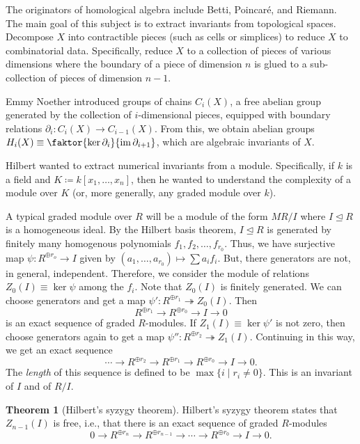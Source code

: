\documentclass[10pt,letterpaper,cm]{nupset}
\theoremstyle{definition}
\theoremstyle{theorem}
\newtheorem{theorem}[definition]{Theorem}
\theoremstyle{remark}
\newcommand{\1}{\mathbf{1}}
\newcommand{\0}{\vec 0}
\DeclareMathOperator{\im}{im}
\begin{document}
The originators of homological algebra include Betti, Poincar\'e, and Riemann. The main goal of this subject is to extract invariants from topological spaces. Decompose $X$ into contractible pieces (such as cells or simplices) to reduce $X$ to combinatorial data. Specifically, reduce $X$ to a collection of pieces of various dimensions where the boundary of a piece of dimension $n$ is glued to a sub-collection of pieces of dimension $n-1$. 

Emmy Noether introduced groups of chains $C_i(X)$, a free abelian group generated by the collection of $i$-dimensional pieces, equipped with boundary relations $\partial_i : C_i(X) \to C_{i-1}(X)$. From this, we obtain abelian groups $H_i(X)\equiv \faktor{\ker{\partial_i}}{\im{\partial_{i+1}}}$, which are algebraic invariants of $X$. 

Hilbert wanted to extract numerical invariants from a module. Specifically, if $k$ is a field and $K\coloneqq  k[x_1, \ldots, x_n]$, then he wanted to understand the complexity of a module over $K$ (or, more generally, any graded module  over $k$).

\bigskip

A typical graded module over $R$ will be a module of the form $M R/I$ where $I \unlhd R$ is a homogeneous ideal. By the Hilbert basis theorem, $I \unlhd R$ is generated by finitely many homogenous polynomials $f_1, f_2, \ldots, f_{r_0}$. Thus, we have surjective map $\psi: R^{\oplus r_o} \to I $ given by $(a_1, \ldots, a_{r_0}) \mapsto \sum a_if_i$. But, there generators are not, in general, independent. Therefore, we consider the module of relations $Z_0(I) \equiv \ker{\psi}$ among the $f_i$. Note that $Z_0(I)$ is finitely generated. We can choose generators and get a map $\psi': R^{\oplus r_1} \twoheadrightarrow Z_0(I)$. Then $$R^{\oplus r_1} \to R^{\oplus r_0} \to I \to 0$$ is an exact sequence of graded $R$-modules. If $Z_1(I) \equiv \ker{\psi'}$ is not zero, then choose generators again to get a map $\psi'': R^{\oplus r_2} \twoheadrightarrow Z_1(I)$. Continuing in this way, we get an exact sequence $$\cdots \to R^{\oplus r_2} \to R^{\oplus r_1} \to R^{\oplus r_0} \to I \to 0.$$ The \textit{length} of this sequence is defined to be $\max\{i \mid r_i \ne 0\}$. This is an invariant of $I$ and of $R/I$.


\begin{theorem}[Hilbert's syzygy theorem]
Hilbert's syzygy theorem states that $Z_{n-1}(I)$ is free, i.e., that there is an exact sequence of graded $R$-modules $$0 \to R^{\oplus r_n} \to R^{\oplus r_{n-1}} \to \cdots \to R^{\oplus r_0} \to I \to 0.$$
\end{theorem}
\end{document}
